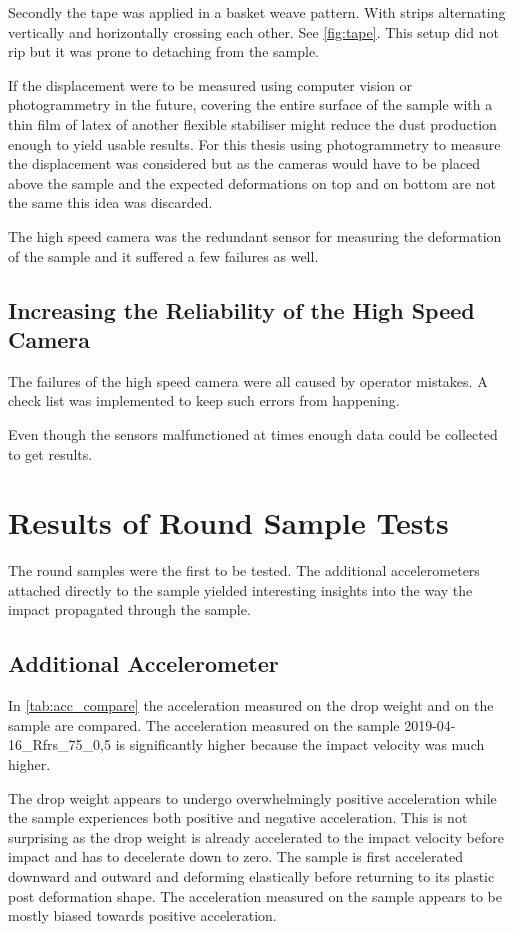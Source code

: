 Secondly the tape was applied in a basket weave pattern. With strips alternating vertically and horizontally crossing each other. See \autoref{fig:tape}.
This setup did not rip but it was prone to detaching from the sample.

If the displacement were to be measured using computer vision or photogrammetry in the future, covering the entire surface of the sample with a thin film of latex of another flexible stabiliser might reduce the dust production enough to yield usable results. For this thesis using photogrammetry to measure the displacement was considered but as the cameras would have to be placed above the sample and the expected deformations on top and on bottom are not the same this idea was discarded.


The high speed camera was the redundant sensor for measuring the deformation of the sample and it suffered a few failures as well.

\subsection{Increasing the Reliability of the High Speed Camera}

The failures of the high speed camera were all caused by operator mistakes. A check list was implemented to keep such errors from happening.

Even though the sensors malfunctioned at times enough data could be collected to get results.

\section{Results of Round Sample Tests}

The round samples were the first to be tested. The additional accelerometers attached directly to the sample yielded interesting insights into the way the impact propagated through the sample.

\subsection{Additional Accelerometer}

In \autoref{tab:acc_compare} the acceleration measured on the drop weight and on the sample are compared. The acceleration measured on the sample 2019-04-16\_Rfrs\_75\_0,5 is significantly higher because the impact velocity was much higher.

The drop weight appears to undergo overwhelmingly positive acceleration while the sample experiences both positive and negative acceleration. This is not surprising as the drop weight is already accelerated to the impact velocity before impact and has to decelerate down to zero. The sample is first accelerated downward and outward and deforming elastically before returning to its plastic post deformation shape.  The acceleration measured on the sample appears to be mostly biased towards positive acceleration. 

